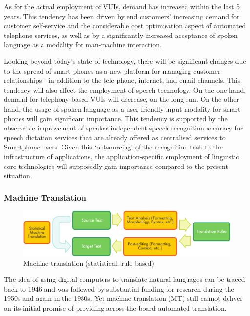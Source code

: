\documentclass[]{../../metanetpaper}
\begin{document}
\begin{multicols}{2}
    As for the actual employment of VUIs, demand has increased within the last 5 years. This tendency has been driven by end customers' increasing demand for customer self-service and the considerable cost optimisation aspect of automated telephone services, as well as by a significantly increased acceptance of spoken language as a modality for man-machine interaction.

    Looking beyond today's state of technology, there will be significant changes due to the spread of smart phones as a new platform for managing customer relationships - in addition to the tele-phone, internet, and email channels. This tendency will also affect the employment of speech technology. On the one hand, demand for telephony-based VUIs will decrease, on the long run. On the other hand, the usage of spoken language as a user-friendly input modality for smart phones will gain significant importance. This tendency is supported by the observable improvement of speaker-independent speech recognition accuracy for speech dictation services that are already offered as centralised services to Smartphone users. Given this `outsourcing' of the recognition task to the infrastructure of applications, the application-specific employment of linguistic core technologies will supposedly gain importance compared to the present situation.

\subsubsection{Machine Translation}

\begin{figure}[htb]
  \center
  \includegraphics[width=\textwidth]{../_media/english/machine_translation}
  \caption{Machine translation (statistical; rule-based)}
  \label{fig:mtarch_en}
\end{figure}

The idea of using digital computers to translate natural languages can be traced back to 1946 and was followed by substantial funding for research during the 1950s and again in the 1980s. 
Yet machine translation (MT) still cannot deliver on its initial promise of providing across-the-board automated translation.  


\end{multicols}
\end{document}
